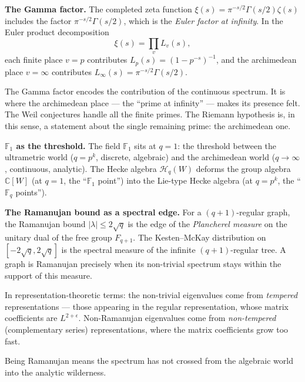 \documentclass[11pt,a4paper]{article}
\theoremstyle{plain}
\theoremstyle{definition}
\newcommand{\C}{\mathbb{C}}
\newcommand{\F}{\mathbb{F}}
\begin{document}
\begin{tcolorbox}[breakable, colback=black!5, colframe=black!5,
  boxrule=0pt, sharp corners]
\textbf{The Gamma factor.}
The completed zeta function $\xi(s) = \pi^{-s/2}\Gamma(s/2)\zeta(s)$
includes the factor $\pi^{-s/2}\Gamma(s/2)$, which is the
\emph{Euler factor at infinity}. In the Euler product decomposition
\[
  \xi(s) = \prod_{v} L_v(s),
\]
each finite place $v = p$ contributes $L_p(s) = (1 - p^{-s})^{-1}$,
and the archimedean place $v = \infty$ contributes
$L_\infty(s) = \pi^{-s/2}\Gamma(s/2)$.

The Gamma factor encodes the contribution of the continuous spectrum.
It is where the archimedean place --- the ``prime at infinity'' ---
makes its presence felt. The Weil conjectures handle all the finite
primes. The Riemann hypothesis is, in this sense, a statement about
the single remaining prime: the archimedean one.
\end{tcolorbox}

\begin{tcolorbox}[breakable, colback=yellow!12, colframe=yellow!12,
  boxrule=0pt, sharp corners]
\textbf{$\F_1$ as the threshold.}
The field $\F_1$ sits at $q = 1$: the threshold between the
ultrametric world ($q = p^k$, discrete, algebraic) and the
archimedean world ($q \to \infty$, continuous, analytic). The Hecke
algebra $\mathcal{H}_q(W)$ deforms the group algebra $\C[W]$ (at
$q = 1$, the ``$\F_1$ point'') into the Lie-type Hecke algebra (at
$q = p^k$, the ``$\F_q$ points'').

\medskip
\textbf{The Ramanujan bound as a spectral edge.}
For a $(q+1)$-regular graph, the Ramanujan bound
$|\lambda| \leq 2\sqrt{q}$ is the edge of the
\emph{Plancherel measure} on the unitary dual of the free group
$F_{q+1}$. The Kesten--McKay distribution on $[-2\sqrt{q}, 2\sqrt{q}]$
is the spectral measure of the infinite $(q+1)$-regular tree. A graph
is Ramanujan precisely when its non-trivial spectrum stays within the
support of this measure.

In representation-theoretic terms: the non-trivial eigenvalues come
from \emph{tempered} representations --- those appearing in the
regular representation, whose matrix coefficients are
$L^{2+\epsilon}$. Non-Ramanujan eigenvalues come from
\emph{non-tempered} (complementary series) representations, where
the matrix coefficients grow too fast.

Being Ramanujan means the spectrum has not crossed from the algebraic
world into the analytic wilderness.
\end{tcolorbox}
\end{document}

